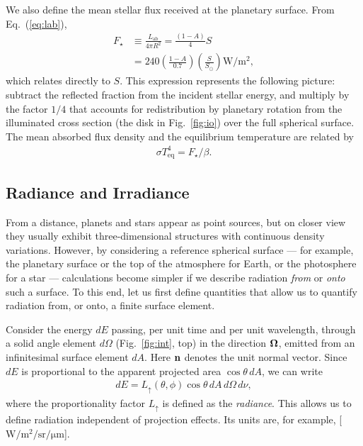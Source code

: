 We also define the mean stellar flux received at the planetary surface. From Eq.~(\ref{eq:lab}),
\begin{align}
\label{eq:aveinpuF}
F_\star &\equiv \frac{L_{\mathrm{ab}}}{4 \pi R^2}= \frac{(1 - A)}{4} S \\
&= 240 \left(\frac{1-A}{0.7}\right) \left(\frac{S}{S_\odot}\right) \mathrm{W/m^2},
\end{align}
which relates directly to $S$. This expression represents the following picture: subtract the reflected fraction from the incident stellar energy, and multiply by the factor $1/4$ that accounts for redistribution by planetary rotation from the illuminated cross section (the disk in Fig.~\ref{fig:io}) over the full spherical surface. The mean absorbed flux density and the equilibrium temperature are related by
\begin{align}
\label{eq:teq}
\sigma T^4_{\mathrm{eq}} = F_\star/\beta.
\end{align}
\subsection*{Radiance and Irradiance}

From a distance, planets and stars appear as point sources, but on closer view they usually exhibit three-dimensional structures with continuous density variations. However, by considering a reference spherical surface --- for example, the planetary surface or the top of the atmosphere for Earth, or the photosphere for a star --- calculations become simpler if we describe radiation \emph{from} or \emph{onto} such a surface. To this end, let us first define quantities that allow us to quantify radiation from, or onto, a finite surface element.

Consider the energy $dE$ passing, per unit time and per unit wavelength, through a solid angle element $d\Omega$ (Fig.~\ref{fig:int}, top) in the direction ${\bf \Omega}$, emitted from an infinitesimal surface element $dA$. Here ${\bf n}$ denotes the unit normal vector. Since $dE$ is proportional to the apparent projected area $\cos{\theta} \, dA$, we can write
\begin{align}
d E = L_{\uparrow}(\theta,\phi) \cos{\theta} \, d A \, d \Omega \, d \nu,
\end{align}
where the proportionality factor $L_{\uparrow}$ is defined as the \emph{radiance}. This allows us to define radiation independent of projection effects. Its units are, for example, [$\mathrm{W/m^2/sr/\mu m}$].


